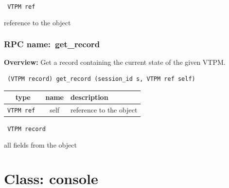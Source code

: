 \vspace{0.3cm}

{\tt 
VTPM ref
}


reference to the object
\vspace{0.3cm}
\vspace{0.3cm}
\vspace{0.3cm}
\subsubsection{RPC name:~get\_record}

{\bf Overview:} 
Get a record containing the current state of the given VTPM.

\begin{verbatim} (VTPM record) get_record (session_id s, VTPM ref self)\end{verbatim}



 
\vspace{0.3cm}
\begin{tabular}{|c|c|p{7cm}|}
 \hline
{\bf type} & {\bf name} & {\bf description} \\ \hline
{\tt VTPM ref } & self & reference to the object \\ \hline 

\end{tabular}

\vspace{0.3cm}

{\tt 
VTPM record
}


all fields from the object
\vspace{0.3cm}
\vspace{0.3cm}
\vspace{0.3cm}

\vspace{1cm}
\newpage
\section{Class: console}
